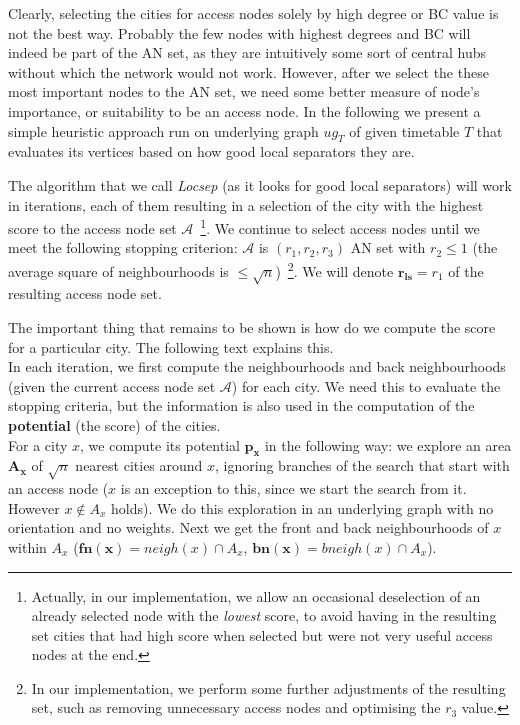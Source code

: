 		Clearly, selecting the cities for access nodes solely by high degree or BC value is not the best way. Probably the few nodes with highest degrees and BC will indeed be part of the AN set, as they are intuitively some sort of central hubs without which the network would not work. However, after we select the these most important nodes to the AN set, we need some better measure of node's importance, or suitability to be an access node. In the following we present a simple heuristic approach run on underlying graph $ug_{T}$ of given timetable $T$ that evaluates its vertices based on how good local separators they are. 
		
		The algorithm that we call \textit{Locsep} (as it looks for good local separators) will work in iterations, each of them resulting in a selection of the city with the highest score to the access node set $\mathcal{A}$~\footnote{Actually, in our implementation, we allow an occasional deselection of an already selected node with the \textit{lowest} score, to avoid having in the resulting set cities that had high score when selected but were not very useful access nodes at the end.}. We continue to select access nodes until we meet the following stopping criterion: $\mathcal{A}$ is $(r_{1}, r_{2}, r_{3})$ AN set with $r_{2} \leq 1$ (the average square of neighbourhoods is $\leq \sqrt{n}$)~\footnote{In our implementation, we perform some further adjustments of the resulting set, such as removing unnecessary access nodes and optimising the $r_{3}$ value.}. We will denote $\bm{r_{ls}} = r_{1}$ of the resulting access node set. 
		
		The important thing that remains to be shown is how do we compute the score for a particular city. The following text explains this. \\
		
		\noindent In each iteration, we first compute the neighbourhoods and back neighbourhoods (given the current access node set $\mathcal{A}$) for each city. We need this to evaluate the stopping criteria, but the information is also used in the computation of the \textbf{potential} (the score) of the cities. \\
		
		\noindent For a city $x$, we compute its potential $\bm{p_{x}}$ in the following way: we explore an area $\bm{A_{x}}$ of $\sqrt{n}$ nearest cities around $x$, ignoring branches of the search that start with an access node ($x$ is an exception to this, since we start the search from it. However $x \not \in A_{x}$ holds). We do this exploration in an underlying graph with no orientation and no weights. Next we get the front and back neighbourhoods of $x$ within $A_{x}$ ($\bm{fn(x)} = neigh(x) \cap A_{x}$, $\bm{bn(x)} = bneigh(x) \cap A_{x}$).
		
